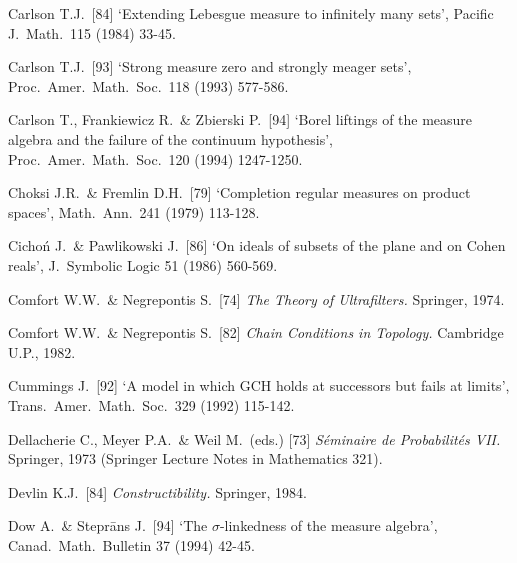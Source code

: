 {\medskip%

Carlson T.J.\ [84] `Extending Lebesgue measure to infinitely many sets',
Pacific J.\ Math.\ 115 (1984) 33-45.
\cmmnt{[552N, \S552 {\it notes.}]}

Carlson T.J.\ [93] `Strong measure zero and strongly meager sets',
Proc.\ Amer.\ Math.\ Soc.\ 118 (1993) 577-586.
\cmmnt{[534R.]}

Carlson T., Frankiewicz R.\ \& Zbierski P.\ [94]
`Borel liftings of the measure
algebra and the failure of the continuum hypothesis', Proc.\ Amer.\ Math.\ Soc.\
120 (1994) 1247-1250.
\cmmnt{[\S535 {\it notes\/}, 554I.]}

Choksi J.R.\ \& Fremlin D.H.\ [79] `Completion regular measures on
product spaces', Math.\ Ann.\ 241 (1979) 113-128.
\cmmnt{[532I.]}


Cicho\'n J.\ \& Pawlikowski J.\ [86]
`On ideals of subsets of the plane and on Cohen
reals', J.\ Symbolic Logic 51 (1986) 560-569.
\cmmnt{[527F.]}


Comfort W.W.\ \& Negrepontis S.\ [74] {\it The Theory of Ultrafilters.}
Springer, 1974.
\cmmnt{[538F, 538Yb.]}

Comfort W.W.\ \& Negrepontis S.\ [82] {\it Chain Conditions in
Topology.}   Cambridge U.P., 1982.
\cmmnt{[516 {\it notes\/}.]}

Cummings J.\ [92] `A model in which GCH holds at successors but fails at
limits',
Trans.\ Amer.\ Math.\ Soc.\ 329 (1992) 115-142.
\cmmnt{[525Z.]}

\medskip%

Dellacherie C., Meyer P.A.\ \& Weil M.\ (eds.) [73]
{\it S\'eminaire de Probabilit\'es VII.}   Springer, 1973
(Springer Lecture Notes in Mathematics 321).

Devlin K.J.\ [84] {\it Constructibility.} Springer, 1984.
\cmmnt{[5A6D.]}


Dow A.\ \& Stepr\=ans J.\ [94] `The $\sigma$-linkedness of the measure
algebra', Canad.\ Math.\ Bulletin 37 (1994) 42-45.
\cmmnt{[524L.]}


}
